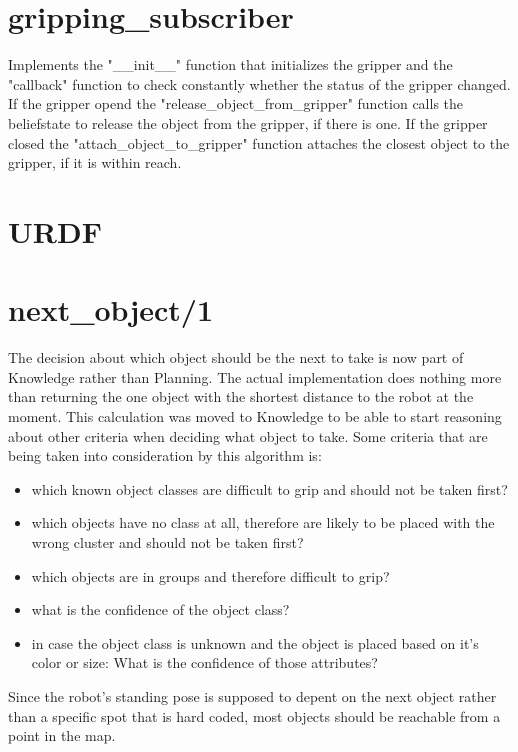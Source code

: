\documentclass[main.tex]{subfiles}
\begin{document}
		\section{gripping\_subscriber}
		Implements the "\_\_init\_\_" function that initializes the gripper and the "callback" function to check constantly whether the status of the gripper changed. If the gripper opend the "release\_object\_from\_gripper" function calls the beliefstate to release the object from the gripper, if there is one. If the gripper closed the "attach\_object\_to\_gripper" function attaches the closest object to the gripper, if it is within reach.


		\section{URDF}


		\section{next\_object/1}
		The decision about which object should be the next to take is now part of Knowledge rather than Planning. The actual implementation does nothing more than returning the one object with the shortest distance to the robot at the moment. This calculation was moved to Knowledge to be able to start reasoning about other criteria when deciding what object to take. Some criteria that are being taken into consideration by this algorithm is:
		
\begin{itemize}
\item which known object classes are difficult to grip and should not be taken first?
\item which objects have no class at all, therefore are likely to be placed with the wrong cluster and should not be taken first?
\item which objects are in groups and therefore difficult to grip?
\item what is the confidence of the object class?
\item in case the object class is unknown and the object is placed based on it's color or size: What is the confidence of those attributes?
\end{itemize}

Since the robot's standing pose is supposed to depent on the next object rather than a specific spot that is hard coded, most objects should be reachable from a point in the map. 
\end{document}
